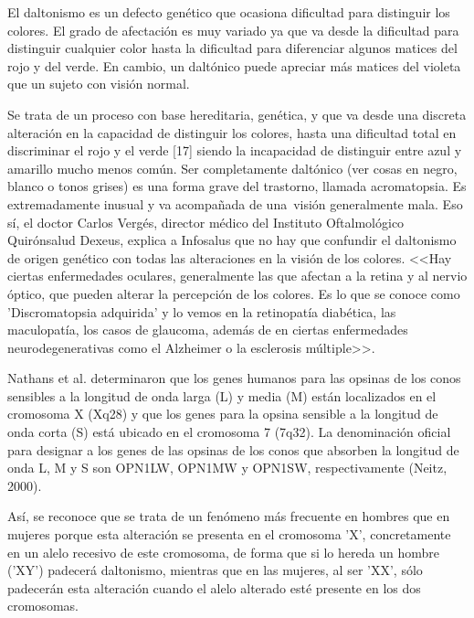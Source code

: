 \documentclass[10pt]{article}
\begin{document}
El daltonismo es un defecto genético que ocasiona dificultad para distinguir los colores. El grado de afectación es muy variado ya que va desde la dificultad para distinguir cualquier color hasta la dificultad para diferenciar algunos matices del rojo y del verde. En cambio, un daltónico puede apreciar más matices del violeta que un sujeto con visión normal\cite{IEEEreferencias:Ref28}.

Se trata de un proceso con base hereditaria, genética, y que va desde una discreta alteración en la capacidad de distinguir los colores, hasta una dificultad total en discriminar el rojo y el verde [17] siendo la incapacidad de distinguir entre azul y amarillo mucho menos común. Ser completamente daltónico (ver cosas en negro, blanco o tonos grises) es una forma grave del trastorno, llamada acromatopsia. Es extremadamente inusual y va acompañada de una visión generalmente mala\cite{IEEEreferencias:Ref29}.
Eso sí, el doctor Carlos Vergés, director médico del Instituto Oftalmológico Quirónsalud Dexeus, explica a Infosalus que no hay que confundir el daltonismo de origen genético con todas las alteraciones en la visión de los colores.    <<Hay ciertas enfermedades oculares, generalmente las que afectan a la retina y al nervio óptico, que pueden alterar la percepción de los colores. Es lo que se conoce como 'Discromatopsia adquirida' y lo vemos en la retinopatía diabética, las maculopatía,  los casos de glaucoma, además de en ciertas enfermedades neurodegenerativas como el Alzheimer o la esclerosis múltiple>>\cite{IEEEreferencias:Ref26}.

Nathans et al. determinaron que los genes humanos para las opsinas de los conos sensibles a la longitud de onda larga (L) y media (M) están localizados en el cromosoma X (Xq28) y que los genes para la opsina sensible a la longitud de onda corta (S) está ubicado en el cromosoma 7 (7q32). La denominación oficial para designar a los genes de las opsinas de los conos que absorben la longitud de onda L, M y S son OPN1LW, OPN1MW y OPN1SW, respectivamente (Neitz, 2000)\cite{IEEEreferencias:Ref30}.

Así, se reconoce que se trata de un fenómeno más frecuente en hombres que en mujeres porque esta alteración se presenta en el cromosoma 'X', concretamente en un alelo recesivo de este cromosoma, de forma que si lo hereda un hombre ('XY') padecerá daltonismo, mientras que en las mujeres, al ser 'XX', sólo padecerán esta alteración cuando el alelo alterado esté presente en los dos cromosomas\cite{IEEEreferencias:Ref26}.
\end{document}
